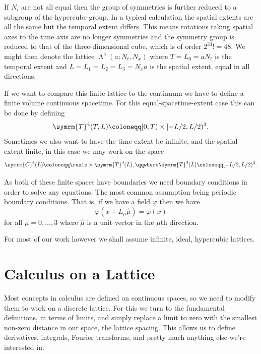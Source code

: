 \documentclass[fleqn]{NotesClass}
\newcommand{\lattice}[1][4]{\upLambda^{#1}}
\begin{document}
    If \(N_i\) are not all equal then the group of symmetries is further reduced to a subgroup of the hypercube group.
    In a typical calculation the spatial extents are all the same but the temporal extent differs.
    This means rotations taking spatial axes to the time axis are no longer symmetries and the symmetry group is reduced to that of the three-dimensional cube, which is of order \(2^33! = 48\).
    We might then denote the lattice \(\lattice(a; N_t, N_x)\) where \(T = L_0 = aN_t\) is the temporal extent and \(L = L_1 = L_2 = L_3 = N_xa\) is the spatial extent, equal in all directions.
    
    If we want to compare this finite lattice to the continuum we have to define a finite volume continuous spacetime.
    For this equal-spacetime-extent case this can be done by defining
    \begin{equation}
        \symrm{T}^4(T, L) \coloneqq [0, T) \times [-L/2, L/2)^3.
    \end{equation}
    Sometimes we also want to have the time extent be infinite, and the spatial extent finite, in this case we may work on the space
    \begin{equation}
        \symrm{C}^4(L) \coloneqq \reals \times \symrm{T}^3(L), \qqwhere \symrm{T}^3(L) \coloneqq [-L/2, L/2)^3.
    \end{equation}
    
    As both of these finite spaces have boundaries we need boundary conditions in order to solve any equations.
    The most common assumption being periodic boundary conditions.
    That is, if we have a field \(\varphi\) then we have
    \begin{equation}
        \varphi(x + L_\mu \hat{\mu}) = \varphi(x)
    \end{equation}
    for all \(\mu = 0, \dotsc, 3\) where \(\hat{\mu}\) is a unit vector in the \(\mu\)th direction.
    
    For most of our work however we shall assume infinite, ideal, hypercubic lattices.
    
    \chapter{Calculus on a Lattice}
    Most concepts in calculus are defined on continuous spaces, so we need to modify them to work on a discrete lattice.
    For this we turn to the fundamental definitions, in terms of limits, and simply replace a limit to zero with the smallest non-zero distance in our space, the lattice spacing.
    This allows us to define derivatives, integrals, Fourier transforms, and pretty much anything else we're interested in.
    
\end{document}

